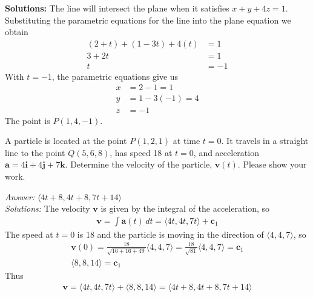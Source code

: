 \begin{parts}
    \ifnum {} {\color{DarkBlue}
    \textbf{Solutions:} The line will intersect the plane when it satisfies $x+y+4z=1$. Substituting the parametric equations for the line into the plane equation we obtain
    \begin{align}
        (2+t) + (1-3t) + 4(t) & = 1\\
        3 +2t & = 1 \\
        t&= -1
    \end{align}
    With $t=-1$, the parametric equations give us 
    \begin{align}
        x&= 2 - 1 = 1 \\
        y&= 1 -3(-1) = 4 \\
        z&= -1 
    \end{align}
    The point is $P(1,4,-1)$. 
    } 
    \else 
    \newpage
    \fi    
\end{parts}

\fi    






\ifnum {}

\question[6] A particle is located at the point $P(1, 2, 1)$ at time $t = 0$. It travels in a straight line to the point $Q(5, 6, 8)$, has speed 18 at $t=0$, and acceleration $\mathbf a = 4\mathbf i + 4\mathbf{j} + 7\mathbf{k} $. Determine the velocity of the particle, $\mathbf  v(t)$.  Please show your work.

\ifnum {} {\color{DarkBlue} \textit{Answer:} $\langle 4t+8,4t+8,7t+14 \rangle$ \\[12pt] \textit{Solutions:} The velocity $\mathbf v$ is given by the integral of the acceleration, so
    \begin{align}
        \mathbf v = \int \mathbf a(t) \, dt = \langle 4t, 4t, 7t\rangle + \mathbf c_1
    \end{align}
    The speed at $t=0$ is 18 and the particle is moving in the direction of $\langle 4,4,7\rangle$, so 
    \begin{align}
        \mathbf v(0) = \frac{18}{\sqrt{16+16+49}} \langle 4,4,7 \rangle = \frac{18}{\sqrt{81}} \langle 4,4,7 \rangle = \mathbf c_1 \\
        \langle 8,8,14\rangle = \mathbf c_1
    \end{align}
    Thus
    \begin{align}
        \mathbf v = \langle 4t,4t,7t\rangle + \langle 8,8,14\rangle = \langle 4t+8,4t+8,7t+14 \rangle
    \end{align}
}
\else
  
